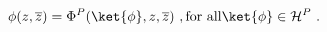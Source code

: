 \begin{equation}
\phi(z,\overline{z})=\Phi^P(\ket{\phi},z,\overline{z}) \ ,
\mathrm{for \ all } \ket{\phi} \in \mathcal{H}^P \ .
\end{equation}


